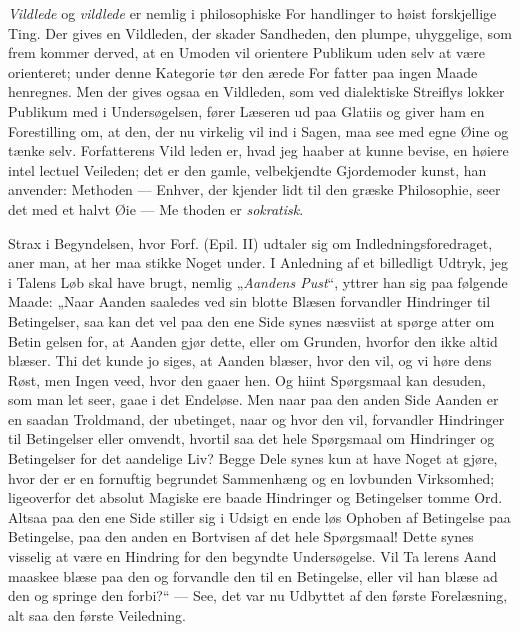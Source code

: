 \documentclass[12pt]{book}
\newcommand{\opage}[1]{\marginnote{\footnotesize\textit{[#1]}}}
\begin{document}
\emph{Vildlede} og \emph{vildlede} er nemlig i philosophiske For\-%
handlinger to høist forskjellige Ting. Der gives en Vildleden,
der skader Sandheden, den plumpe, uhyggelige, som frem\-%
kommer derved, at en Umoden vil orientere Publikum uden
selv at være orienteret; under denne Kategorie tør den ærede For\-%
fatter paa ingen Maade henregnes. Men der gives ogsaa en
Vildleden, som ved dialektiske Streiflys lokker Publikum med
i Undersøgelsen, fører Læseren ud paa Glatiis og giver ham
en Forestilling om, at den, der nu virkelig vil ind i Sagen,
maa see med egne Øine og tænke selv. Forfatterens Vild\-%
leden er, hvad jeg haaber at kunne bevise, en høiere intel\-%
lectuel Veileden; det er den gamle, velbekjendte Gjordemoder\-%
kunst, han anvender: Methoden --- Enhver, der kjender lidt til
den græske Philosophie, seer det med et halvt Øie --- Me\-%
thoden er \emph{sokratisk}.

Strax i Begyndelsen, hvor Forf. (Epil. II) udtaler sig
om Indledningsforedraget, aner man, at her maa stikke Noget
under. I Anledning af et billedligt Udtryk, jeg i Talens Løb
skal have brugt, nemlig „\emph{Aandens Pust}“, yttrer han sig
paa følgende Maade: „Naar Aanden saaledes ved sin blotte
Blæsen forvandler Hindringer til Betingelser, saa kan det vel
paa den ene Side synes næsviist at spørge atter om Betin\-%
gelsen for, at Aanden gjør dette, eller om Grunden, hvorfor
den ikke altid blæser. Thi det kunde jo siges, at Aanden
blæser, hvor den vil, og vi høre dens Røst, men Ingen veed,
\opage{312}\setcounter{footnote}{0}%
hvor den gaaer hen. Og hiint Spørgsmaal kan desuden,
som man let seer, gaae i det Endeløse. Men naar paa den
anden Side Aanden er en saadan Troldmand, der ubetinget,
naar og hvor den vil, forvandler Hindringer til Betingelser
eller omvendt, hvortil saa det hele Spørgsmaal om Hindringer
og Betingelser for det aandelige Liv? Begge Dele synes kun
at have Noget at gjøre, hvor der er en fornuftig begrundet
Sammenhæng og en lovbunden Virksomhed; ligeoverfor det
absolut Magiske ere baade Hindringer og Betingelser tomme
Ord. Altsaa paa den ene Side stiller sig i Udsigt en ende\-%
løs Ophoben af Betingelse paa Betingelse, paa den anden en
Bortvisen af det hele Spørgsmaal! Dette synes visselig at
være en Hindring for den begyndte Undersøgelse. Vil Ta\-%
lerens Aand maaskee blæse paa den og forvandle den til en
Betingelse, eller vil han blæse ad den og springe den forbi?“
--- See, det var nu Udbyttet af den første Forelæsning, alt\-%
saa den første Veiledning.
\end{document}
